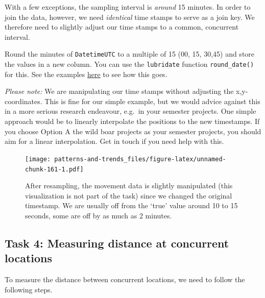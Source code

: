 \documentclass[]{book}
\begin{document}
With a few exceptions, the sampling interval is \emph{around} 15
minutes. In order to join the data, however, we need \emph{identical}
time stamps to serve as a join key. We therefore need to slightly adjust
our time stamps to a common, concurrent interval.

Round the minutes of \texttt{DatetimeUTC} to a multiple of 15 (00, 15,
30,45) and store the values in a new column. You can use the
\texttt{lubridate} function \texttt{round\_date()} for this. See the
examples
\href{https://lubridate.tidyverse.org/reference/round_date.html}{here}
to see how this goes.

\emph{Please note:} We are manipulating our time stamps without
adjusting the x,y-coordinates. This is fine for our simple example, but
we would advice against this in a more serious research endeavour,
e.g.~in your semester projects. One simple approach would be to linearly
interpolate the positions to the new timestamps. If you choose Option A
the wild boar projects as your semester projects, you should aim for a
linear interpolation. Get in touch if you need help with this.

\begin{figure}
\centering
\texttt{[image: patterns-and-trends\_files/figure-latex/unnamed-chunk-161-1.pdf]}
\caption{\label{fig:unnamed-chunk-161}After resampling, the movement data is
slightly manipulated (this visualization is not part of the task) since
we changed the original timestamp. We are usually off from the `true'
value around 10 to 15 seconds, some are off by as much as 2 minutes.}
\end{figure}

\subsection{Task 4: Measuring distance at concurrent
locations}\label{task-4-measuring-distance-at-concurrent-locations}

To measure the distance between concurrent locations, we need to follow
the following steps.
\end{document}
